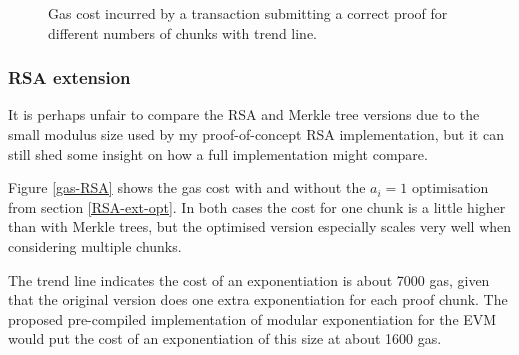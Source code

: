 \documentclass[12pt,a4paper,twoside,openright]{report}
\begin{document}
\begin{figure}[h]
\datatable
{}

\caption[Gas cost for multiple chunk proofs]{Gas cost incurred by a transaction submitting a correct proof for different numbers of chunks with trend line.}
\label{gas-multichunk}
\end{figure}

\subsubsection{RSA extension}

It is perhaps unfair to compare the RSA and Merkle tree versions due to the small modulus size used by my proof-of-concept RSA implementation,
but it can still shed some insight on how a full implementation might compare.

Figure \ref{gas-RSA} shows the gas cost with and without the $a_i = 1$ optimisation from section \ref{RSA-ext-opt}.
In both cases the cost for one chunk is a little higher than with Merkle trees, but the optimised version especially scales very well when considering multiple chunks.

The trend line indicates the cost of an exponentiation is about 7000 gas, given that the original version does one extra exponentiation
for each proof chunk.
The proposed pre-compiled implementation of modular exponentiation for the EVM would put the cost of
an exponentiation of this size at about 1600 gas\cite{eip-rsa}.
\end{document}
